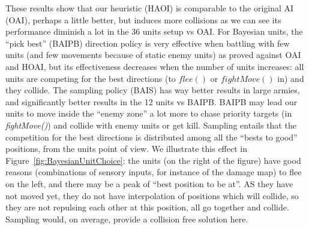 These results show that our heuristic (HAOI) is comparable to the original AI (OAI), perhaps a little better, but induces more collisions as we can see its performance diminish a lot in the 36 units setup vs OAI. For Bayesian units, the ``pick best'' (BAIPB) direction policy is very effective when battling with few units (and few movements because of static enemy units) as proved against OAI and HOAI, but its effectiveness decreases when the number of units increases: all units are competing for the best directions (to $flee()$ or $fightMove()$ in) and they collide. The sampling policy (BAIS) has way better results in large armies, and significantly better results in the 12 units vs BAIPB. BAIPB may lead our units to move inside the ``enemy zone'' a lot more to chase priority targets (in \textit{fightMove()}) and collide with enemy units or get kill. Sampling entails that the competition for the best directions is distributed among all the ``bests to good'' positions, from the units point of view. We illustrate this effect in Figure~\ref{fig:BayesianUnitChoice}: the units (on the right of the figure) have good reasons (combinations of sensory inputs, for instance of the damage map) to flee on the left, and there may be a peak of ``best position to be at''. AS they have not moved yet, they do not have interpolation of positions which will collide, so they are not repulsing each other at this position, all go together and collide. Sampling would, on average, provide a collision free solution here.
